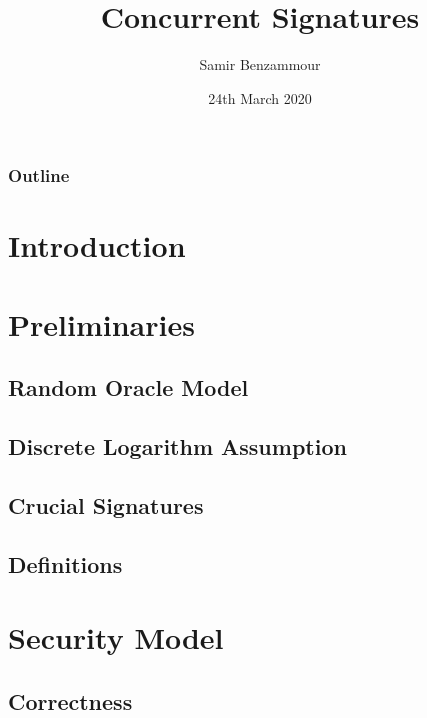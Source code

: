 \documentclass{beamer}
\title{Concurrent Signatures}
\author{Samir Benzammour}
\date{24th March 2020}
\institute[RWTH]{
  Algorithms and Computational Complexity\\
  RWTH Aachen University
}
\begin{document}
\frame{\titlepage}

\begin{frame}
	\frametitle{Outline}
	\tableofcontents
\end{frame}

\section{Introduction}


\section{Preliminaries}


\subsection{Random Oracle Model}
% 

\subsection{Discrete Logarithm Assumption}
% 

\subsection{Crucial Signatures}
% 

\subsection{Definitions}
% 

\section{Security Model}


\subsection{Correctness}
% 
\end{document}
